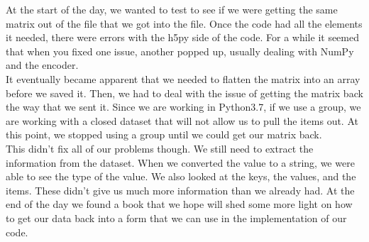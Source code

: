 
At the start of the day, we wanted to test to see if we were getting the same matrix out of the file that we got into the file. Once the code had all the elements it needed, there were errors with the h5py side of the code. For a while it seemed that when you fixed one issue, another popped up, usually dealing with NumPy and the encoder. \\

It eventually became apparent that we needed to flatten the matrix into an array before we saved it. Then, we had to deal with the issue of getting the matrix back the way that we sent it. Since we are working in Python3.7, if we use a group, we are working with a closed dataset that will not allow us to pull the items out. At this point, we stopped using a group until we could get our matrix back. \\

This didn't fix all of our problems though. We still need to extract the information from the dataset. When we converted the value to a string, we were able to see the type of the value. We also looked at the keys, the values, and the items. These didn't give us much more information than we already had. At the end of the day we found a book that we hope will shed some more light on how to get our data back into a form that we can use in the implementation of our code.